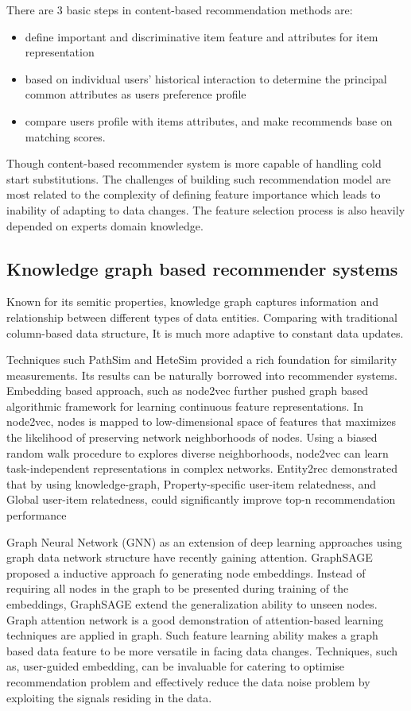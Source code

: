 There are 3 basic steps in content-based recommendation methods are: 
\begin{itemize}
    \item define important and discriminative item feature and attributes for item representation
    \item based on individual users' historical interaction to determine the principal common attributes as users preference profile
    \item compare users profile with items attributes, and make recommends base on matching scores.
\end{itemize}

Though content-based recommender system is more capable of handling cold start substitutions. The challenges of building such recommendation model are most related to the complexity of defining feature importance which leads to inability of adapting to data changes. The feature selection process is also heavily depended on experts domain knowledge. 

\subsection{Knowledge graph based recommender systems}
Known for its semitic properties, knowledge graph captures information and relationship between different types of data entities. Comparing with traditional column-based data structure, It is much more adaptive to constant data updates. 

Techniques such PathSim \citep{Sun2011PathSim} and HeteSim \citep{Shi2013HeteSim} provided a rich foundation for similarity measurements. Its results can be naturally borrowed into recommender systems. 
Embedding based approach, such as node2vec \citep{grover2016node2vec} further pushed graph based algorithmic framework for learning continuous feature representations. In node2vec, nodes is mapped to low-dimensional space of features that maximizes the likelihood of preserving network neighborhoods of nodes. Using a biased random walk procedure to explores diverse neighborhoods, node2vec can learn task-independent representations in complex networks. 
Entity2rec \citep{palumbo2017entity2rec} demonstrated that by using knowledge-graph, Property-specific user-item relatedness, and Global user-item relatedness, could significantly improve top-n recommendation performance

Graph Neural Network (GNN) as an extension of deep learning approaches using graph data network structure have recently gaining attention. 
GraphSAGE \citep{hamilton2017inductive} proposed a inductive approach fo generating node embeddings. Instead of requiring all nodes in the graph to be presented during training of the embeddings, GraphSAGE extend the generalization ability to unseen nodes. 
Graph attention network \citep{lee2018graph} is a good demonstration of attention-based learning techniques are applied in graph. Such feature learning ability makes a graph based data feature to be more versatile in facing data changes. 
Techniques, such as, user-guided embedding, can be invaluable for catering to optimise recommendation problem and effectively reduce the data noise problem by exploiting the signals residing in the data.

